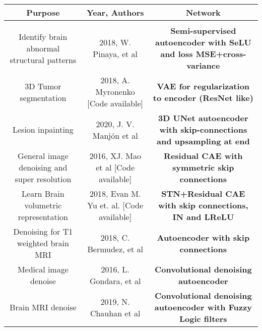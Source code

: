 \begin{table}[!ht]
    \setlength\extrarowheight{2pt} %
    \begin{tabularx}{\textwidth}{C C C}
    \hline
        \textbf{Purpose} & \textbf{Year, Authors} & \textbf{Network} \\
        \hline
        
        \\
        
        \hline
        
        Identify brain abnormal structural patterns & 2018, W. Pinaya, et al \cite{pinaya2019} & \textbf{Semi-supervised autoencoder with SeLU and loss MSE+cross-variance} \\
        
        3D Tumor segmentation & 2018, A. Myronenko \cite{myronenko20183d} [Code available] & \textbf{VAE for regularization to encoder (ResNet like)} \\
        
         Lesion inpainting & 2020, J. V. Manjón et al \cite{2020inpainting} & \textbf{3D UNet autoencoder with skip-connections and upsampling at end} \\
         
         General image denoising and super resolution & 2016, XJ. Mao et al \cite{superresolution} [Code available] & \textbf{Residual CAE with symmetric skip connections} \\
        
        Learn Brain volumetric representation &  2018, Evan  M.  Yu  et.   al. \cite{learnvolrepreCODE} [Code available] & \textbf{STN+Residual CAE with skip connections, IN and LReLU} \\
        \hline
        
        Denoising for T1 weighted brain MRI & 2018, C. Bermudez, et al \cite{bermudez2018t1autoencoder} & \textbf{Autoencoder with skip connections} \\
        
        Medical image denoise & 2016, L. Gondara, et al \cite{gondara2016medicalautoencoder} &\textbf{Convolutional denoising autoencoder} \\
        
        Brain MRI denoise & 2019, N. Chauhan et al \cite{fuzzyautoencoder} & \textbf{Convolutional denoising autoencoder with Fuzzy Logic filters} \\


\end{tabularx}
\end{table}
